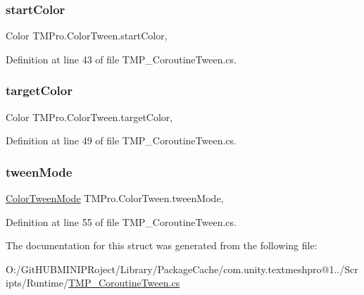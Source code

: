 \subsubsection{\texorpdfstring{startColor}{startColor}}
{\footnotesize\ttfamily Color T\+M\+Pro.\+Color\+Tween.\+start\+Color\hspace{0.3cm}{\ttfamily [get]}, {\ttfamily [set]}}



Definition at line 43 of file T\+M\+P\+\_\+\+Coroutine\+Tween.\+cs.

\mbox{\label{struct_t_m_pro_1_1_color_tween_af6f6e8d0db57003afbaa35865364f342}} 
\subsubsection{\texorpdfstring{targetColor}{targetColor}}
{\footnotesize\ttfamily Color T\+M\+Pro.\+Color\+Tween.\+target\+Color\hspace{0.3cm}{\ttfamily [get]}, {\ttfamily [set]}}



Definition at line 49 of file T\+M\+P\+\_\+\+Coroutine\+Tween.\+cs.

\mbox{\label{struct_t_m_pro_1_1_color_tween_aef6eb969db69ffdcef35e0f13f2e0dc2}} 
\subsubsection{\texorpdfstring{tweenMode}{tweenMode}}
{\footnotesize\ttfamily \mbox{\hyperlink{struct_t_m_pro_1_1_color_tween_a22465a1cc95d87abd9ca22c2dd021fbd}{Color\+Tween\+Mode}} T\+M\+Pro.\+Color\+Tween.\+tween\+Mode\hspace{0.3cm}{\ttfamily [get]}, {\ttfamily [set]}}



Definition at line 55 of file T\+M\+P\+\_\+\+Coroutine\+Tween.\+cs.



The documentation for this struct was generated from the following file\+:\begin{DoxyCompactItemize}
\item 
O\+:/\+Git\+H\+U\+B\+M\+I\+N\+I\+P\+Roject/\+Library/\+Package\+Cache/com.\+unity.\+textmeshpro@1../\+Scripts/\+Runtime/\mbox{\hyperlink{_t_m_p___coroutine_tween_8cs}{T\+M\+P\+\_\+\+Coroutine\+Tween.\+cs}}\end{DoxyCompactItemize}
